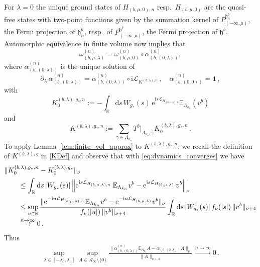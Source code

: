 \documentclass[a4paper]{article}
\newcommand{\E}{\mathbb{E}}
\newcommand{\e}{\mathrm{e}}
\newcommand{\D}{\mathrm{d}}
\renewcommand{\i}{\mathrm{i}}
\newcommand{\La}{\Lambda}
\newcommand{\w}{\omega}
\newcommand{\mA}{\mathcal{A}}
\newcommand{\R}{\mathbb{R}}
\newcommand{\mL}{\mathcal{L}}
\DeclarePairedDelimiter\abs{\lvert}{\rvert}
\theoremstyle{plain}
\theoremstyle{definition}
\theoremstyle{remark}
\renewcommand{\(}{\left(}
\renewcommand{\)}{\right)}
\begin{document}
For $\lambda=0$ the unique ground states of $H_{(b,\mu,0),n}$ resp.\ $H_{(b,\mu,0)}$ are the quasi-free states with two-point functions given by the summation kernel of $P_{(-\infty,\mu)}^{\mathfrak{h}^b_{n}}$, the Fermi projection of $\mathfrak{h}_{n}^b$, resp.\ of $P_{(-\infty,\mu)}^{\mathfrak{h}^b}$, the Fermi projection of $\mathfrak{h}^b$.
Automorphic equivalence in finite volume \cite{BMNS12} now implies that
\[
\w_{(b,\mu,\lambda)}^{(n)} = \w_{(b,\mu,0)}^{(n)} \circ \alpha_{(b,(0, \lambda))}^{(n)},
\]
where $\alpha_{(b,(0, \lambda))}^{(n)}$ is the unique solution of 
\[
\partial_\lambda \,\alpha_{(b,( 0, \lambda))}^{(n)} = \alpha_{(b,( 0, \lambda))}^{(n)} \circ \i \mL_{K^{(b,\lambda),n}}\,,
\quad \alpha_{(b,(0, 0))}^{(n)} = \mathbf{1}\,,
\]
with 
\[
K^{(b,\lambda),g_*,n}_0   := 
-  \int_\R \D s\, W_{g_*}(s)
\,\e^{\i s\mL_{H_{(b,\mu,\lambda),n}}} \E_{\La_{k_n}}(v^b)
\]
and
\[ 
K^{(b,\lambda),g_*,n}   := 
 \sum_{\gamma\in\Lambda_{k_n}}  T^b|_{\Lambda_{k_n}, \gamma}  K^{(b,\lambda),g_*,n}_0 
\,.
\]
  To apply Lemma~\ref{lem:finite_vol_approx} to   $K^{(b,\lambda),g_*,n}$, we recall the definition of $K^{(b,\lambda),g}$ in \eqref{KDef} and observe that with \eqref{eq:dynamics_converges} we have
\begin{align*}
    \hspace{2em}&\hspace{-2em}
    \lVert    K^{(b,\lambda),g_*,n}_0 -  K^{(b,\lambda),g_*}_0  \rVert_\nu
    \\
    &\leq
    \int_{\R}\mathrm{d}s \, \abs{W_{g_*}(s)}  \left\|
    \e^{\i s\mL_{H_{(b,\mu,\lambda),n}}}  \, \E_{\La_{k_n}} v^b - \e^{\i s\mL_{H_{(b,\mu,\lambda)}}}   \, v^b 
    \right\|_\nu  
    \\
    &\leq
    \sup_{u\in\R}\frac{\lVert \e^{-\i u \mL_{H_{(b,\mu,\lambda),n}}}\E_{\La_{k_n}} v^b - \e^{-\i u \mL_{H_{(b,\mu,\lambda)}}} v^b \rVert_\nu}{f_\nu(|u|)\,\lVert v^b \rVert_{\nu+4}}
    \int_{\R}\mathrm{d}s \, \abs{W_{g_*}(s)} \,f_\nu(|s|)\, \|v^b\|_{\nu+4} 
    \\
    &\stackrel{n\to\infty}{\rightarrow} 0\,.
\end{align*}
 Thus
\begin{align}\label{eq:Auto_convergence}
        \sup_{\lambda \in [-\lambda_0,\lambda_0]} \sup_{A\in \mA_\infty\setminus \{0\}} \frac{\lVert \alpha_{(b,(0, \lambda))}^{(n)} \E_{\La_{k_n}} A - \alpha_{(b,(0, \lambda))} A \rVert_\nu}{\lVert A \rVert_{\nu+4}}\,  \xrightarrow{n\to \infty} 0\, .
\end{align}
\end{document}
